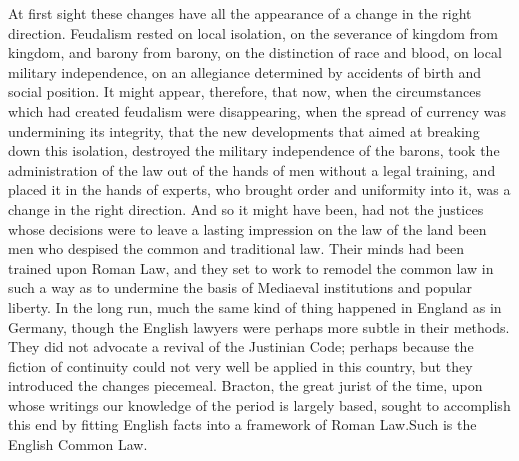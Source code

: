 \documentclass{book}
\begin{document}
At first sight these changes have all the appearance of a change in the right direction. Feudalism rested on local isolation, on the severance of kingdom from kingdom, and barony from barony, on the distinction of race and blood, on local military independence, on an allegiance determined by accidents of birth and social position. It might appear, therefore, that now, when the circumstances which had created feudalism were disappearing, when the spread of currency was undermining its integrity, that the new developments that aimed at breaking down this isolation, destroyed the military independence of the barons, took the administration of the law out of the hands of men without a legal training, and placed it in the hands of experts, who brought order and uniformity into it, was a change in the right direction. And so it might have been, had not the justices whose decisions were to leave a lasting impression on the law of the land been men who despised the common and traditional law. Their minds had been trained upon Roman Law, and they set to work to remodel the common law in such a way as to undermine the basis of Mediaeval institutions and popular liberty. In the long run, much the same kind of thing happened in England as in Germany, though the English lawyers were perhaps more subtle in their methods. They did not advocate a revival of the Justinian Code; perhaps because the fiction of continuity could not very well be applied in this country, but they introduced the changes piecemeal. Bracton, the great jurist of the time, upon whose writings our knowledge of the period is largely based, sought to accomplish this end by fitting English facts into a framework of Roman Law.\footnotemark[2] Such is the English Common Law.
\end{document}
